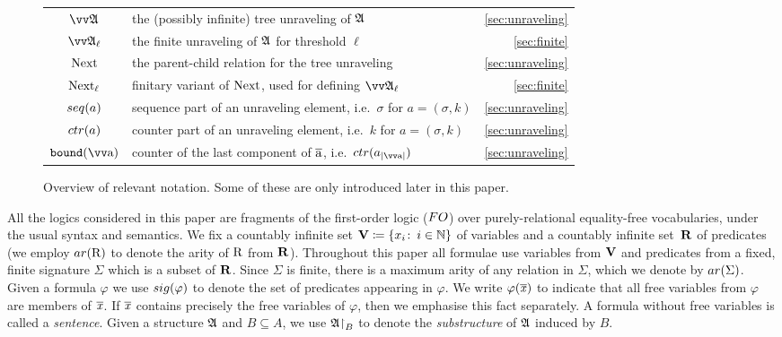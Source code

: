 \begin{figure}
\begin{tabularx}{\textwidth}{c X r}
    $\unravel{A}$ & the (possibly infinite) tree unraveling of ${\mathfrak{A}}$ & \cref{sec:unraveling} \\
    $\unravel{A}_{\ell}$ & the finite unraveling of ${\mathfrak{A}}$ for threshold $\ell$ & \cref{sec:finite} \\
    $\mathrm{Next}$ & the parent-child relation for the tree unraveling & \cref{sec:unraveling} \\
    $\mathrm{Next}_{\ell}$ & finitary variant of $\mathrm{Next}$, used for defining $\unravel{A}_{\ell}$ & \cref{sec:finite} \\
    $\seq{a}$ & sequence part of an unraveling element, i.e.\ $\sigma$ for $a = (\sigma, k)$ & \cref{sec:unraveling} \\
    $\ctr{a}$ & counter part of an unraveling element, i.e.\ $k$ for $a = (\sigma, k)$ & \cref{sec:unraveling} \\
    $\mathtt{bound}(\elemtuptuplea)$ & counter of the last component of $\overline{\mathrm{a}}$, i.e.\ $\ctr{a_{|\elemtuptuplea|}}$ & \cref{sec:unraveling} \\
  \end{tabularx}
  \egroup
  \caption{Overview of relevant notation. Some of these are only introduced later in this paper.}\label{fig:notation-quickref}
\end{figure}

All the logics considered in this paper are fragments of the first-order logic ($\FO$) over purely-relational equality-free vocabularies, under the usual syntax and semantics. 
We fix a countably infinite set $\mathbf{V} \coloneqq \{x_i \colon\, i \in {\mathbb{N}}\}$ of variables and a countably infinite set~$\mathbf{R}$ of predicates (we employ $\arity(\relR)$ to denote the arity of $\mathrm{R}$ from $\mathbf{R}$).
Throughout this paper all formulae use variables from $\mathbf{V}$ and predicates from a fixed, finite signature $\Sigma$ which is a subset of $\mathbf{R}$.
Since $\Sigma$ is finite, there is a maximum arity of any relation in $\Sigma$, which we denote by $\arity(\Sigma)$.
Given a formula $\varphi$ we use $\sig(\varphi)$ to denote the set of predicates appearing in $\varphi$. 
We write $\varphi(\overline{\mathit{x}})$ to indicate that all free variables from $\varphi$ are members of $\overline{\mathit{x}}$. 
If $\overline{\mathit{x}}$ contains precisely the free
variables of $\varphi$, then we emphasise this fact separately.
A formula without free variables is called a \emph{sentence}.
Given a structure ${\mathfrak{A}}$ and $B \subseteq A$, we use ${\mathfrak{A}}\mathord{\upharpoonright}_{B}$ to denote the \emph{substructure} of ${\mathfrak{A}}$ induced by $B$.\\

